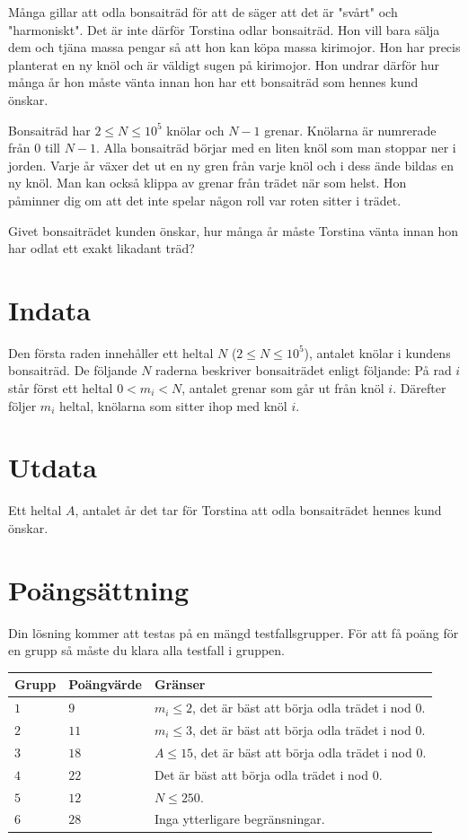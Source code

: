 Många gillar att odla bonsaiträd för att de säger att det är "svårt" och "harmoniskt". Det är inte därför Torstina odlar bonsaiträd. Hon vill bara sälja dem och tjäna massa pengar så att hon kan köpa massa kirimojor. Hon har precis planterat en ny knöl och är väldigt sugen på kirimojor. Hon undrar därför hur många år hon måste vänta innan hon har ett bonsaiträd som hennes kund önskar.

Bonsaiträd har $2\leq N \leq 10^5$ knölar och $N-1$ grenar. Knölarna är numrerade från 0 till $N-1$. Alla bonsaiträd börjar med en liten knöl som man stoppar ner i jorden. Varje år växer det ut en ny gren från varje knöl och i dess ände bildas en ny knöl. Man kan också klippa av grenar från trädet när som helst. Hon påminner dig om att det inte spelar någon roll var roten sitter i trädet. 

Givet bonsaiträdet kunden önskar, hur många år måste Torstina vänta innan hon har odlat ett exakt likadant träd?

\section*{Indata}
Den första raden innehåller ett heltal $N$ ($2 \leq N \leq 10^5$), antalet knölar i kundens bonsaiträd.
De följande $N$ raderna beskriver bonsaiträdet enligt följande:
På rad $i$ står först ett heltal $0 < m_i < N$, antalet grenar som går ut från knöl $i$. Därefter följer $m_i$ heltal, knölarna som sitter ihop med knöl $i$. 

\section*{Utdata}
Ett heltal $A$, antalet år det tar för Torstina att odla bonsaiträdet hennes kund önskar.

\section*{Poängsättning}
Din lösning kommer att testas på en mängd testfallsgrupper.
För att få poäng för en grupp så måste du klara alla testfall i gruppen.

\noindent
\begin{tabular}{| l | l | p{12cm} |}
  \hline
  Grupp & Poängvärde & Gränser \\ \hline
  $1$   & $9$        & $m_i\leq 2$, det är bäst att börja odla trädet i nod 0. \\ \hline
  $2$   & $11$       & $m_i \leq 3$, det är bäst att börja odla trädet i nod 0. \\ \hline
  $3$   & $18$       & $A \leq 15$, det är bäst att börja odla trädet i nod 0. \\ \hline
  $4$   & $22$       & Det är bäst att börja odla trädet i nod 0. \\ \hline
  $5$   & $12$       & $N \leq 250$. \\ \hline
  $6$   & $28$       & Inga ytterligare begränsningar. \\ \hline
\end{tabular}


